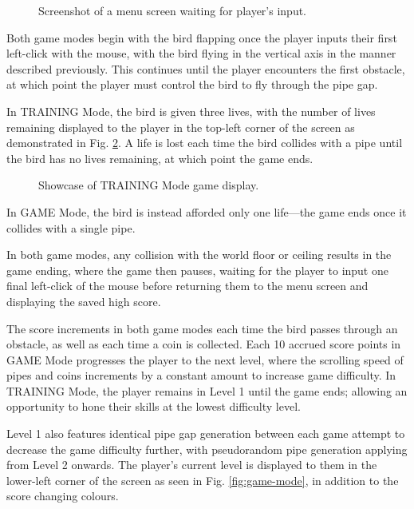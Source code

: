 \documentclass[conference]{IEEEtran}
\begin{document}
\begin{figure}[htbp]
	\caption{Screenshot of a menu screen waiting for player's input.}
	\label{fig:menu-screen}
\end{figure}

Both game modes begin with the bird flapping once the player inputs their first left-click with the mouse, with the bird flying in the vertical axis in the manner described previously. This continues until the player encounters the first obstacle, at which point the player must control the bird to fly through the pipe gap.

In TRAINING Mode, the bird is given three lives, with the number of lives remaining displayed to the player in the top-left corner of the screen as demonstrated in Fig. \ref{fig:training-mode}. A life is lost each time the bird collides with a pipe until the bird has no lives remaining, at which point the game ends.

\begin{figure}[htbp]
	\caption{Showcase of TRAINING Mode game display.}
	\label{fig:training-mode}
\end{figure}

In GAME Mode, the bird is instead afforded only one life—the game ends once it collides with a single pipe.

In both game modes, any collision with the world floor or ceiling results in the game ending, where the game then pauses, waiting for the player to input one final left-click of the mouse before returning them to the menu screen and displaying the saved high score.

The score increments in both game modes each time the bird passes through an obstacle, as well as each time a coin is collected. Each 10 accrued score points in GAME Mode progresses the player to the next level, where the scrolling speed of pipes and coins increments by a constant amount to increase game difficulty. In TRAINING Mode, the player remains in Level 1 until the game ends; allowing an opportunity to hone their skills at the lowest difficulty level.

Level 1 also features identical pipe gap generation between each game attempt to decrease the game difficulty further, with pseudorandom pipe generation applying from Level 2 onwards. The player's current level is displayed to them in the lower-left corner of the screen as seen in Fig. \ref{fig:game-mode}, in addition to the score changing colours.
\end{document}
